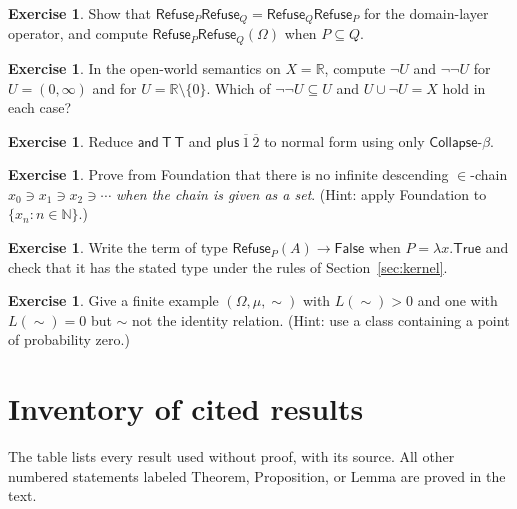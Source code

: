 \documentclass[11pt]{article}
\newcommand{\Refuse}{\mathsf{Refuse}}
\newcommand{\Coll}{\mathsf{Collapse}}
\newcommand{\Om}{\Omega}
\theoremstyle{definition}
\newtheorem{exercise}[definition]{Exercise}
\theoremstyle{plain}
\theoremstyle{remark}
\begin{document}
\begin{exercise}
Show that $\Refuse_P\Refuse_Q=\Refuse_Q\Refuse_P$ for the domain-layer operator, and compute $\Refuse_P\Refuse_Q(\Om)$ when $P\subseteq Q$.
\end{exercise}
\begin{exercise}
In the open-world semantics on $X=\mathbb{R}$, compute $\neg U$ and $\neg\neg U$ for $U=(0,\infty)$ and for $U=\mathbb{R}\setminus\{0\}$. Which of $\neg\neg U\subseteq U$ and $U\cup\neg U=X$ hold in each case?
\end{exercise}
\begin{exercise}
Reduce $\mathsf{and}\ \mathsf{T}\ \mathsf{T}$ and $\mathsf{plus}\ \overline1\ \overline2$ to normal form using only $\Coll$-$\beta$.
\end{exercise}
\begin{exercise}
Prove from Foundation that there is no infinite descending $\in$-chain $x_0\ni x_1\ni x_2\ni\cdots$ \emph{when the chain is given as a set}. (Hint: apply Foundation to $\{x_n:n\in\mathbb{N}\}$.)
\end{exercise}
\begin{exercise}
Write the term of type $\Refuse_P(A)\to\mathsf{False}$ when $P=\lambda x.\mathsf{True}$ and check that it has the stated type under the rules of Section~\ref{sec:kernel}.
\end{exercise}
\begin{exercise}
Give a finite example $(\Om,\mu,\sim)$ with $L(\sim)>0$ and one with $L(\sim)=0$ but $\sim$ not the identity relation. (Hint: use a class containing a point of probability zero.)
\end{exercise}

\appendix
\section{Inventory of cited results}\label{app:cited}

The table lists every result used without proof, with its source. All other numbered statements labeled Theorem, Proposition, or Lemma are proved in the text.
\end{document}
